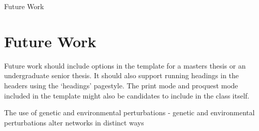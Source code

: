 Future Work

\section{Future Work}

Future work should include options in the template for a masters thesis or an undergraduate senior thesis. It should also support running headings in the headers using the `headings' pagestyle.  The print mode and proquest mode included in the template might also be candidates to include in the class itself. 

\begin{outline}
\1 The use of genetic and environmental perturbations - genetic and environmental perturbations alter networks in distinct ways
\1 

\end{outline}